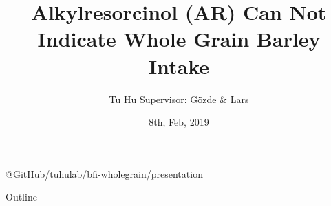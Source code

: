 \documentclass{beamer}
\title{Alkylresorcinol (AR) Can Not Indicate Whole Grain Barley Intake}
\author{Tu Hu \newline \tiny{ Supervisor: Gözde \& Lars}}
\institute{University of Copenhagen}
\date{8th, Feb, 2019}
\begin{document}
\begin{frame}
  \titlepage

  \tiny{@GitHub/tuhulab/bfi-wholegrain/presentation}
\end{frame}

\begin{frame}{Outline}
  \tableofcontents
\end{frame}
\end{document}
